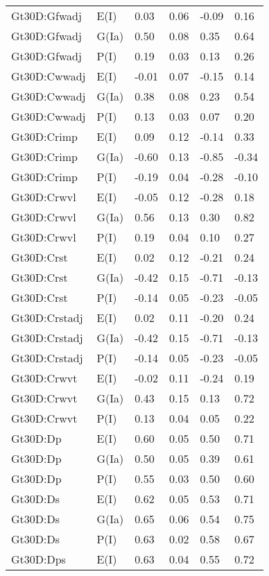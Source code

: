 \begin{center}
\begin{longtable}{|p{1.1in}|p{0.7in}|p{0.7in}|p{0.6in}|p{0.6in}|p{0.6in}|}
  Gt30D:Gfwadj & E(I) & 0.03 & 0.06 & -0.09 & 0.16 \\ 
  Gt30D:Gfwadj & G(Ia) & 0.50 & 0.08 & 0.35 & 0.64 \\ 
  Gt30D:Gfwadj & P(I) & 0.19 & 0.03 & 0.13 & 0.26 \\ 
  Gt30D:Cwwadj & E(I) & -0.01 & 0.07 & -0.15 & 0.14 \\ 
  Gt30D:Cwwadj & G(Ia) & 0.38 & 0.08 & 0.23 & 0.54 \\ 
  Gt30D:Cwwadj & P(I) & 0.13 & 0.03 & 0.07 & 0.20 \\ 
  Gt30D:Crimp & E(I) & 0.09 & 0.12 & -0.14 & 0.33 \\ 
  Gt30D:Crimp & G(Ia) & -0.60 & 0.13 & -0.85 & -0.34 \\ 
  Gt30D:Crimp & P(I) & -0.19 & 0.04 & -0.28 & -0.10 \\ 
  Gt30D:Crwvl & E(I) & -0.05 & 0.12 & -0.28 & 0.18 \\ 
  Gt30D:Crwvl & G(Ia) & 0.56 & 0.13 & 0.30 & 0.82 \\ 
  Gt30D:Crwvl & P(I) & 0.19 & 0.04 & 0.10 & 0.27 \\ 
  Gt30D:Crst & E(I) & 0.02 & 0.12 & -0.21 & 0.24 \\ 
  Gt30D:Crst & G(Ia) & -0.42 & 0.15 & -0.71 & -0.13 \\ 
  Gt30D:Crst & P(I) & -0.14 & 0.05 & -0.23 & -0.05 \\ 
  Gt30D:Crstadj & E(I) & 0.02 & 0.11 & -0.20 & 0.24 \\ 
  Gt30D:Crstadj & G(Ia) & -0.42 & 0.15 & -0.71 & -0.13 \\ 
  Gt30D:Crstadj & P(I) & -0.14 & 0.05 & -0.23 & -0.05 \\ 
  Gt30D:Crwvt & E(I) & -0.02 & 0.11 & -0.24 & 0.19 \\ 
  Gt30D:Crwvt & G(Ia) & 0.43 & 0.15 & 0.13 & 0.72 \\ 
  Gt30D:Crwvt & P(I) & 0.13 & 0.04 & 0.05 & 0.22 \\ 
  Gt30D:Dp & E(I) & 0.60 & 0.05 & 0.50 & 0.71 \\ 
  Gt30D:Dp & G(Ia) & 0.50 & 0.05 & 0.39 & 0.61 \\ 
  Gt30D:Dp & P(I) & 0.55 & 0.03 & 0.50 & 0.60 \\ 
  Gt30D:Ds & E(I) & 0.62 & 0.05 & 0.53 & 0.71 \\ 
  Gt30D:Ds & G(Ia) & 0.65 & 0.06 & 0.54 & 0.75 \\ 
  Gt30D:Ds & P(I) & 0.63 & 0.02 & 0.58 & 0.67 \\ 
  Gt30D:Dps & E(I) & 0.63 & 0.04 & 0.55 & 0.72 \\ 

\end{longtable}
\end{center}
